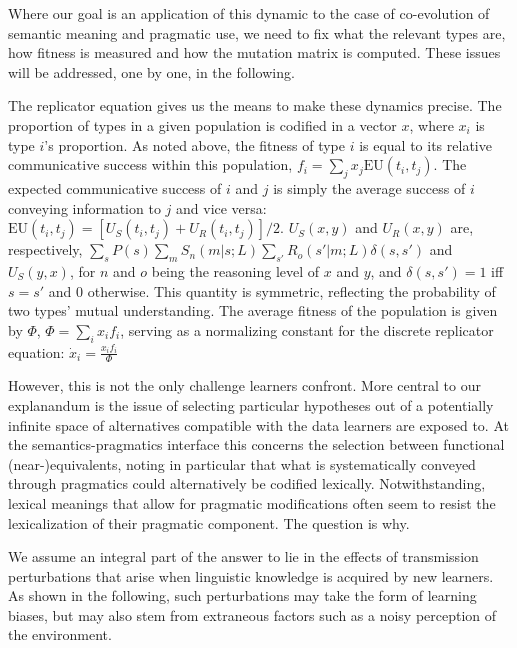 \documentclass[a4paper]{article}
\begin{document}
Where our goal is an application of this dynamic to the case of co-evolution of semantic
meaning and pragmatic use, we need to fix what the relevant types are, how fitness is measured
and how the mutation matrix is computed. These issues will be addressed, one by one, in the
following.

\bigskip

The replicator equation gives us the means to make these dynamics precise. The proportion of
types in a given population is codified in a vector $x$, where $x_i$ is type $i$'s
proportion. As noted above, the fitness of type $i$ is equal to its relative communicative
success within this population, $f_i = \sum_j x_j \text{EU}(t_i,t_j)$. The expected
communicative success of $i$ and $j$ is simply the average success of $i$ conveying information
to $j$ and vice versa: $\text{EU}(t_i,t_j) = [U_S(t_i,t_j) + U_R(t_i,t_j)]/2$. $U_S(x,y)$ and
$U_R(x,y)$ are, respectively, $\sum_s P(s)\sum_m S_n(m|s;L) \sum_{s'} R_o(s'|m;L) \delta(s,s')$
and $U_S(y,x)$, for $n$ and $o$ being the reasoning level of $x$ and $y$, and
$\delta(s,s') = 1$ iff $s = s'$ and $0$ otherwise. This quantity is symmetric, reflecting the
probability of two types' mutual understanding. The average fitness of the population is given
by $\Phi$, $\Phi = \sum_i x_i f_i$, serving as a normalizing constant for the discrete
replicator equation: $\dot{x}_i = \frac{x_i f_i}{\Phi}$

\bigskip

However, this is
not the only challenge learners confront. More central to our explanandum is the issue of
selecting particular hypotheses out of a potentially infinite space of alternatives compatible
with the data learners are exposed to. At the semantics-pragmatics interface this concerns the
selection between functional (near-)equivalents, noting in particular that what is
systematically conveyed through pragmatics could alternatively be codified
lexically. Notwithstanding, lexical meanings that allow for pragmatic modifications often seem
to resist the lexicalization of their pragmatic component. The question is why.

We assume an integral part of the answer to lie in the effects of transmission perturbations that arise when linguistic knowledge is acquired by new learners. As shown in the following, such perturbations may take the form of learning biases, but may also stem from extraneous factors such as a noisy perception of the environment.
\end{document}

